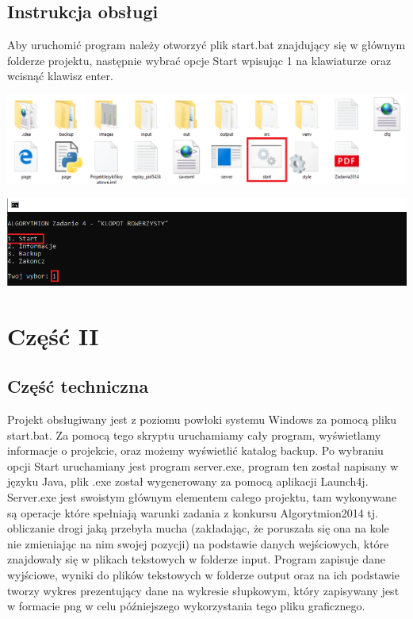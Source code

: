 \documentclass[12pt,a4paper]{article}
\begin{document}
	\newpage\newpage
	\subsection*{Instrukcja obsługi}
	Aby uruchomić program należy otworzyć plik start.bat znajdujący się w głównym folderze projektu, następnie wybrać opcje Start wpisując 1 na klawiaturze oraz wcisnąć klawisz enter.
		
			\includegraphics[scale=0.6]{instrukcja}

			\includegraphics[scale=0.8]{instrukcja2}
	
	
\newpage
	\section*{Część II}
	\subsection*{Część techniczna}
Projekt obsługiwany jest z poziomu powłoki systemu Windows za pomocą pliku start.bat. Za pomocą tego skryptu uruchamiamy cały program, wyświetlamy informacje o projekcie, oraz możemy wyświetlić katalog backup. Po wybraniu opcji Start uruchamiany jest program server.exe, program ten został napisany w języku Java, plik .exe został wygenerowany za pomocą  aplikacji Launch4j. Server.exe jest swoistym głównym elementem całego projektu, tam wykonywane są operacje które spełniają warunki zadania z konkursu Algorytmion2014 tj.
obliczanie drogi jaką przebyła mucha (zakładając, że poruszała się ona na kole nie zmieniając na nim swojej pozycji) na podstawie danych wejściowych, które znajdowały się w plikach tekstowych w folderze input. Program zapisuje dane wyjściowe, wyniki do plików tekstowych w folderze output oraz na ich podstawie tworzy wykres prezentujący dane na wykresie słupkowym, który zapisywany jest w formacie png w celu późniejszego wykorzystania tego pliku graficznego.\\
\end{document}
